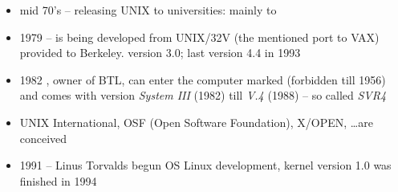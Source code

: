 \begin{slide}
\begin{itemize}
\item mid 70's -- releasing UNIX to universities: mainly to 
\item 1979 --  is being
developed from UNIX/32V (the mentioned port to VAX) provided to Berkeley.
version 3.0; last version 4.4 in 1993
\item 1982 , owner of BTL, can enter the computer marked
(forbidden till 1956) and comes with version \emph{System III} (1982)
till \emph{V.4} (1988) -- so called \emph{SVR4}
\item UNIX International, OSF (Open Software Foundation),
X/OPEN, \dots are conceived
\item 1991 -- Linus Torvalds begun OS Linux development, kernel version 1.0 was
finished in 1994
\end{itemize}
\end{slide}

